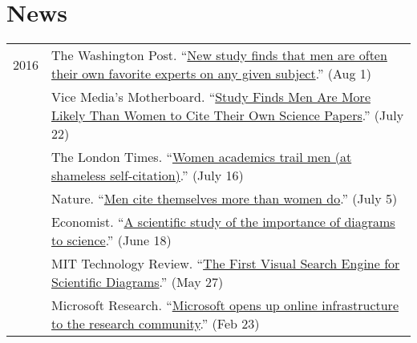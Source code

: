 \documentclass[11pt]{article}
\begin{document}
\section*{\textbf{News}}
\begin{longtable}{p{0.5in}|p{5.5in}}
  2016  
  		& The Washington Post. ``\href{https://www.washingtonpost.com/news/wonk/wp/2016/08/01/new-study-finds-that-men-are-often-their-own-favorite-experts-on-any-given-subject/?tid=sm_tw}{New study finds that men are often their own favorite experts on any given subject}.'' (Aug 1) \\

      & Vice Media's Motherboard. ``\href{http://motherboard.vice.com/read/manciting-study-finds-men-cite-their-own-science-papers-more-than-women}{Study Finds Men Are More Likely Than Women to Cite Their Own Science Papers}.'' (July 22) \\

      & The London Times. ``\href{http://www.economist.com/news/science-and-technology/21700617-scientific-study-importance-diagrams-science-graphic-details}{Women academics trail men (at shameless self-citation)}.'' (July 16) \\ 

      & Nature. ``\href{http://www.nature.com/news/men-cite-themselves-more-than-women-do-1.20176?WT.mc_id=TWT_NatureNews}{Men cite themselves more than women do}.'' (July 5) \\ 

      & Economist. ``\href{http://www.economist.com/news/science-and-technology/21700617-scientific-study-importance-diagrams-science-graphic-details}{A scientific study of the importance of diagrams to science}.'' (June 18) \\
  		& MIT Technology Review. ``\href{https://www.technologyreview.com/s/601589/the-first-visual-search-engine-for-scientific-diagrams/}{The First Visual Search Engine for Scientific Diagrams}.'' (May 27) \\
        & Microsoft Research. ``\href{https://blogs.msdn.microsoft.com/msr_er/2016/02/23/microsoft-opens-up-online-infrastructure-to-the-research-community/}{Microsoft opens up online infrastructure to the research community}.'' (Feb 23) \\


\end{longtable}
\end{document}
